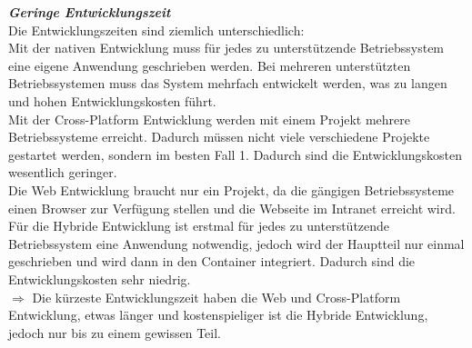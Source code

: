 \documentclass[ngerman]{article}
\begin{document}
    \textbf{\textit{Geringe Entwicklungszeit}}\\
    Die Entwicklungszeiten sind ziemlich unterschiedlich:\\
    \indent Mit der nativen Entwicklung muss für jedes zu unterstützende Betriebssystem eine eigene Anwendung geschrieben werden. Bei mehreren unterstützten Betriebssystemen muss das System mehrfach entwickelt werden, was zu langen und hohen Entwicklungskosten führt.\\
    \indent Mit der Cross-Platform Entwicklung werden mit einem Projekt mehrere Betriebssysteme erreicht. Dadurch müssen nicht viele verschiedene Projekte gestartet werden, sondern im besten Fall 1. Dadurch sind die Entwicklungskosten wesentlich geringer.\\
    \indent Die Web Entwicklung braucht nur ein Projekt, da die gängigen Betriebssysteme einen Browser zur Verfügung stellen und die Webseite im Intranet erreicht wird.\\
    \indent Für die Hybride Entwicklung ist erstmal für jedes zu unterstützende Betriebssystem eine Anwendung notwendig, jedoch wird der Hauptteil nur einmal geschrieben und wird dann in den Container integriert. Dadurch sind die Entwicklungskosten sehr niedrig.\\
    \indent$\Rightarrow$ Die kürzeste Entwicklungszeit haben die Web und Cross-Platform Entwicklung, etwas länger und kostenspieliger ist die Hybride Entwicklung, jedoch nur bis zu einem gewissen Teil.\\\\
\end{document}
